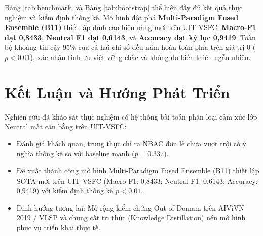 \documentclass[10pt,journal,compsoc]{IEEEtran}
\begin{document}
Bảng \ref{tab:benchmark} và Bảng \ref{tab:bootstrap} thể hiện đầy đủ kết quả thực nghiệm và kiểm định thống kê. Mô hình đột phá \textbf{Multi-Paradigm Fused Ensemble (B11)} thiết lập đỉnh cao hiệu năng mới trên UIT-VSFC: \textbf{Macro-F1 đạt 0,8433}, \textbf{Neutral F1 đạt 0,6143}, và \textbf{Accuracy đạt kỷ lục 0,9419}. Toàn bộ khoảng tin cậy 95\% của cả hai chỉ số đều nằm hoàn toàn phía trên giá trị 0 ($p < 0.01$), xác nhận tính ưu việt vững chắc và không do biến thiên ngẫu nhiên.

\section{Kết Luận và Hướng Phát Triển}
Nghiên cứu đã khảo sát thực nghiệm có hệ thống bài toán phân loại cảm xúc lớp Neutral mất cân bằng trên UIT-VSFC:
\begin{itemize}
    \item Đánh giá khách quan, trung thực chỉ ra NBAC đơn lẻ chưa vượt trội có ý nghĩa thống kê so với baseline mạnh ($p = 0.337$).
    \item Đề xuất thành công mô hình Multi-Paradigm Fused Ensemble (B11) thiết lập SOTA mới trên UIT-VSFC (Macro-F1: 0,8433; Neutral F1: 0,6143; Accuracy: 0,9419) với kiểm định thống kê $p < 0.01$.
    \item Định hướng tương lai: Mở rộng kiểm chứng Out-of-Domain trên AIViVN 2019 / VLSP và chưng cất tri thức (Knowledge Distillation) nén mô hình phục vụ triển khai thực tế.
\end{itemize}
\end{document}
